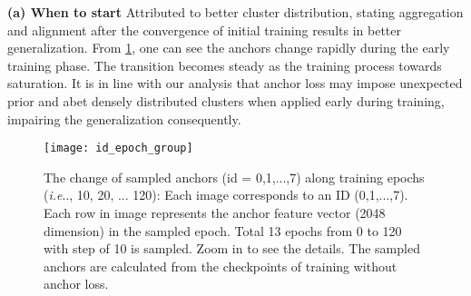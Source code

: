 \documentclass[runningheads]{llncs}
\makeatletter
\DeclareRobustCommand\onedot{\futurelet\@let@token\@onedot}
\def\@onedot{\ifx\@let@token.\else.\null\fi\xspace}
\def\ie{\emph{i.e}\onedot} \def\Ie{\emph{I.e}\onedot}
\makeatother
\begin{document}
\noindent \textbf{(a) When to start} Attributed to better cluster distribution, stating aggregation and alignment after the convergence of initial training results in better generalization.
From \cref{fig:id-feature-change}, one can see the anchors change rapidly during the early training phase.
The transition becomes steady as the training process towards saturation.
It is in line with our analysis that anchor loss may impose unexpected prior and abet densely distributed clusters when applied early during training, impairing the generalization consequently.

\begin{table}[t]
    \centering
    \caption{Ablation study for three factors on Market1501 dataset: starting epoch , aggregation methods (\cref{eq:avg_aggregation}\&\cref{eq:weighted_aggregation}) and anchor loss choices(\cref{eq:intra-anchor}\&\cref{eq:triplet-anchor}).  and  denote the extracted feature and its label. Before   is used in the first stage training. Afterwards, either  or  is applied. We updates the anchors each epoch as in \cref{alg:anchors-epoch}.}
    \label{tab:comp-ablation}
    \vspace*{-0.68cm}
\end{table}

\begin{figure}
    \centering
\texttt{[image: id\_epoch\_group]}
    \caption{The change of sampled anchors (id = {0,1,...,7}) along training epochs (\ie 0, 10, 20, ... 120): Each image corresponds to an ID ({0,1,...,7}). Each row in image represents the anchor feature vector (2048 dimension) in the sampled epoch. Total 13 epochs from 0 to 120 with step of 10 is sampled. Zoom in to see the details. The sampled anchors are calculated from the checkpoints of training without anchor loss.}
    \label{fig:id-feature-change}
    \vspace*{-0.68cm}
\end{figure}
\end{document}
